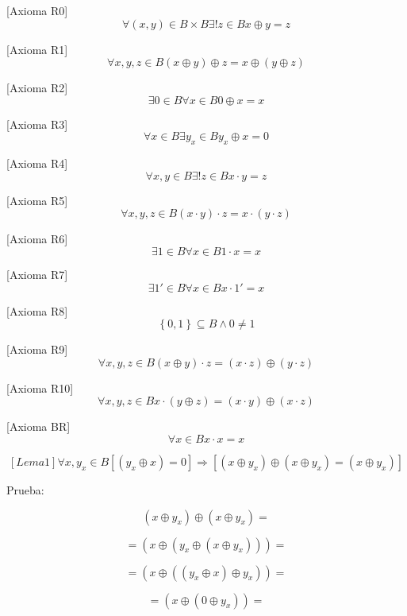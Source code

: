 \documentclass[
]{article}
\begin{document}
\begin{enumerate}
\begin{enumerate}
\begin{enumerate}
      {[}Axioma R0{]}\emph{
      }\[\forall{\left( {x,y} \right) \in {B \times B}}\exists\mathtt{\mathrm{!}}{z \in B}x \oplus {y = z}\]

      {[}Axioma R1{]}
      \[\forall x,y,{z \in B}\left( {x \oplus y} \right) \oplus {z = x} \oplus \left( {y \oplus z} \right)\]

      {[}Axioma R2{]}
      \[\exists{0 \in B}\forall{x \in B}0 \oplus {x = x}\]

      {[}Axioma R3{]}
      \[\forall{x \in B}\exists{y_{x} \in B}y_{x} \oplus {x = 0}\]

      {[}Axioma R4{]}
      \[\forall x,{y \in B}\exists\mathtt{\mathrm{!}}{z \in B}{{x \cdot y} = z}\]

      {[}Axioma R5{]}
      \[\forall x,y,{z \in B}{{\left( {x \cdot y} \right) \cdot z} = {x \cdot \left( {y \cdot z} \right)}}\]

      {[}Axioma R6{]}
      \[\exists{1 \in B}\forall{x \in B}{{1 \cdot x} = x}\]

      {[}Axioma R7{]}
      \[\exists 1{' \in B}\forall{x \in B}{x \cdot 1}{' = x}\]

      {[}Axioma R8{]}
      \[{\left\{ 0,1 \right\} \subseteq {B \land 0}} \neq 1\]

      {[}Axioma R9{]}
      \[\forall x,y,{z \in B}{{\left( {x \oplus y} \right) \cdot z} = \left( {x \cdot z} \right)} \oplus \left( {y \cdot z} \right)\]

      {[}Axioma
      R10{]}\[\forall x,y,{z \in B}{{x \cdot \left( {y \oplus z} \right)} = \left( {x \cdot y} \right)} \oplus \left( {x \cdot z} \right)\]

      {[}Axioma BR{]}\[\forall{x \in B}{{x \cdot x} = x}\]

      \[\left\lbrack {{Lema}1} \right\rbrack\forall x,{y_{x} \in B}{}{}{}\left\lbrack {\left( {y_{x} \oplus x} \right) = 0} \right\rbrack\Rightarrow\left\lbrack {\left( {x \oplus y_{x}} \right) \oplus {\left( {x \oplus y_{x}} \right) = \left( {x \oplus y_{x}} \right)}} \right\rbrack\]

      Prueba:

      \[\left( {x \oplus y_{x}} \right) \oplus {\left( {x \oplus y_{x}} \right) =}\]

      \[{= \left( {x \oplus \left( {y_{x} \oplus \left( {x \oplus y_{x}} \right)} \right)} \right)} =\]

      \[{= \left( {x \oplus \left( {\left( {y_{x} \oplus x} \right) \oplus y_{x}} \right)} \right)} =\]

      \[{= \left( {x \oplus \left( {0 \oplus y_{x}} \right)} \right)} =\]


\end{enumerate}
\end{enumerate}
\end{enumerate}
\end{document}
